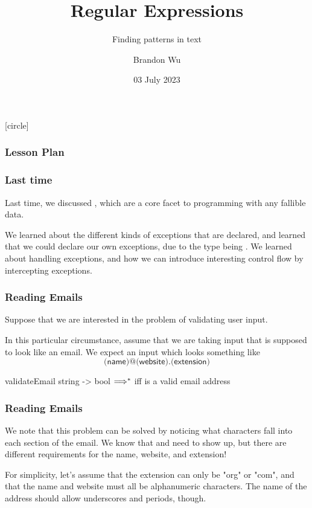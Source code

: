 \documentclass[aspectratio=169]{beamer}
\title{Regular Expressions} %
\subtitle{Finding patterns in text} %
\date{03 July 2023} %
\author{Brandon Wu} %
\newif\ifcolorlambda
\begin{document}
\ifweb
    \renewcommand{\pause}{}
\fi

[circle]

{
\begin{frame}[plain]
    \colorlambdatrue
    \titlepage
\end{frame}
}

\begin{frame}[fragile]
  \frametitle{Lesson Plan}

  \tableofcontents
\end{frame}

\begin{frame}[fragile]
  \frametitle{Last time}

  Last time, we discussed , which are a core facet to 
  programming with any fallible data.

  We learned about the different kinds of exceptions that are declared,
  and learned that we could declare our own exceptions, due to the
   type being . We learned about handling
  exceptions, and how we can introduce interesting control flow by
  intercepting exceptions. 
\end{frame}


\begin{frame}[fragile]
  \frametitle{Reading Emails}

  Suppose that we are interested in the problem of validating user input.

  In this particular circumstance, assume that we are taking input that is
  supposed to look like an email. We expect an input which looks something like
  $$\textsf{(name)@(website).(extension)}$$

  \spec
    {validateEmail}
    {string -> bool}
    {}
    { $\Longrightarrow^*$  iff  is a valid 
    email address}
\end{frame}

\begin{frame}[fragile]
  \frametitle{Reading Emails}

  We note that this problem can be solved by noticing what characters fall into
  each section of the email. We know that  and  need to show
  up, but there are different requirements for the name, website, and extension!

  For simplicity, let's assume that the extension can only be "org" or "com", and
  that the name and website must all be alphanumeric characters. The name of the
  address should allow underscores and periods, though. 
\end{frame}
\end{document}
